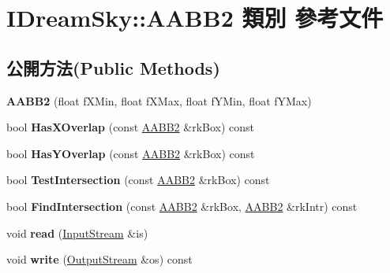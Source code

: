 \hypertarget{class_i_dream_sky_1_1_a_a_b_b2}{}\section{I\+Dream\+Sky\+:\+:A\+A\+B\+B2 類別 參考文件}
\label{class_i_dream_sky_1_1_a_a_b_b2}
\subsection*{公開方法(Public Methods)}
\begin{DoxyCompactItemize}
\item 
{\bfseries A\+A\+B\+B2} (float f\+X\+Min, float f\+X\+Max, float f\+Y\+Min, float f\+Y\+Max)\hypertarget{class_i_dream_sky_1_1_a_a_b_b2_ad4d727a2c66b90bb22a8c22e9b830589}{}\label{class_i_dream_sky_1_1_a_a_b_b2_ad4d727a2c66b90bb22a8c22e9b830589}

\item 
bool {\bfseries Has\+X\+Overlap} (const \hyperlink{class_i_dream_sky_1_1_a_a_b_b2}{A\+A\+B\+B2} \&rk\+Box) const \hypertarget{class_i_dream_sky_1_1_a_a_b_b2_abc2734442404f66a6099bc2fc38c346b}{}\label{class_i_dream_sky_1_1_a_a_b_b2_abc2734442404f66a6099bc2fc38c346b}

\item 
bool {\bfseries Has\+Y\+Overlap} (const \hyperlink{class_i_dream_sky_1_1_a_a_b_b2}{A\+A\+B\+B2} \&rk\+Box) const \hypertarget{class_i_dream_sky_1_1_a_a_b_b2_a531e23321014e2adc0468da4120bde68}{}\label{class_i_dream_sky_1_1_a_a_b_b2_a531e23321014e2adc0468da4120bde68}

\item 
bool {\bfseries Test\+Intersection} (const \hyperlink{class_i_dream_sky_1_1_a_a_b_b2}{A\+A\+B\+B2} \&rk\+Box) const \hypertarget{class_i_dream_sky_1_1_a_a_b_b2_ae5c96b6189b854a10bbc6949b87bf78a}{}\label{class_i_dream_sky_1_1_a_a_b_b2_ae5c96b6189b854a10bbc6949b87bf78a}

\item 
bool {\bfseries Find\+Intersection} (const \hyperlink{class_i_dream_sky_1_1_a_a_b_b2}{A\+A\+B\+B2} \&rk\+Box, \hyperlink{class_i_dream_sky_1_1_a_a_b_b2}{A\+A\+B\+B2} \&rk\+Intr) const \hypertarget{class_i_dream_sky_1_1_a_a_b_b2_a332fd7737dc2754744d4e1387270b4dc}{}\label{class_i_dream_sky_1_1_a_a_b_b2_a332fd7737dc2754744d4e1387270b4dc}

\item 
void {\bfseries read} (\hyperlink{class_i_dream_sky_1_1_input_stream}{Input\+Stream} \&is)\hypertarget{class_i_dream_sky_1_1_a_a_b_b2_a914cebba4a04cbbe29ad2ad8e4be6794}{}\label{class_i_dream_sky_1_1_a_a_b_b2_a914cebba4a04cbbe29ad2ad8e4be6794}

\item 
void {\bfseries write} (\hyperlink{class_i_dream_sky_1_1_output_stream}{Output\+Stream} \&os) const \hypertarget{class_i_dream_sky_1_1_a_a_b_b2_aa057b7088afb863bdabefa5aeb432dfa}{}\label{class_i_dream_sky_1_1_a_a_b_b2_aa057b7088afb863bdabefa5aeb432dfa}

\end{DoxyCompactItemize}
